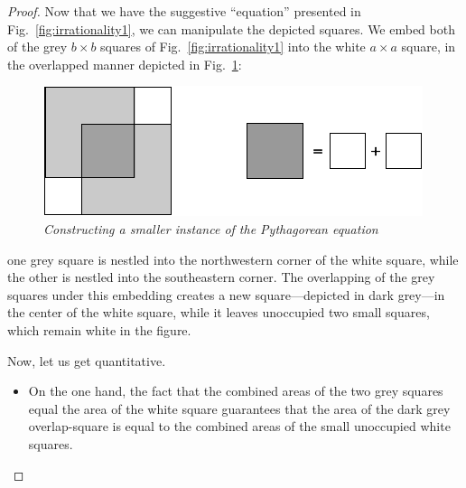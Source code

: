 \begin{proof}
Now that we have the suggestive ``equation'' presented in Fig.~\ref{fig:irrationality1}, we can manipulate the depicted squares.  We embed both of the grey $b \times b$ squares of
Fig.~\ref{fig:irrationality1} into the white $a \times a$ square, in the overlapped manner depicted in Fig.~\ref{fig:irrationality2}:
\begin{figure}[htb]
\begin{center}
       \includegraphics[scale=0.4]{FiguresArithmetic/sqrt2final}
\caption{{\it Constructing a smaller instance of the Pythagorean equation}
\label{fig:irrationality2}}
\end{center}
\end{figure}
one grey square is nestled into the northwestern corner of the white square, while the other is nestled into the southeastern corner.  The overlapping of the grey squares under this embedding creates a new square---depicted in dark grey---in the center of the white square, while it leaves unoccupied two small squares, which remain white in the figure.

\smallskip

Now, let us get quantitative.
\begin{itemize}
\item
On the one hand, the fact that the combined areas of the two grey squares equal the area of the white square guarantees that the area of the dark grey overlap-square is equal to the combined areas of the small unoccupied white squares.


\end{itemize}
\end{proof}
